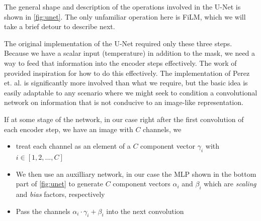 \documentclass[12pt]{article}
\begin{document}
The general shape and description of the operations involved in the U-Net is shown in \ref{fig:unet}. The only unfamiliar operation here
is FiLM, which we will take a brief detour to describe next.

The original implementation of the U-Net required only these three steps. Because we have a scalar input (temperature) in addition to the mask, 
we need a way to feed that information into the encoder steps effectively. The work of \cite{perez2017filmvisualreasoninggeneral} provided inspiration
for how to do this effectively. The implementation of Perez et. al. is significantly more involved than what we require, but the basic idea is easily
adaptable to any scenario where we might seek to condition a convolutional network on information that is not conducive to an image-like representation.

If at some stage of the network, in our case right after the first convolution of each encoder step, we have an image with $C$ channels, we 

\begin{itemize}
	\item treat each channel as an element of a $C$ component vector $\gamma_i$ with $i\in[1,2,...,C]$
	\item We then use an auxilliary network, in our case the MLP shown in the bottom part of \ref{fig:unet}
	to generate $C$ component vectors $\alpha_i$ and $\beta_i$ which are \textit{scaling} and \textit{bias} factors, respectively
	\item Pass the channels $\alpha_i \cdot \gamma_i + \beta_i$ into the next convolution
\end{itemize} 
\end{document}
